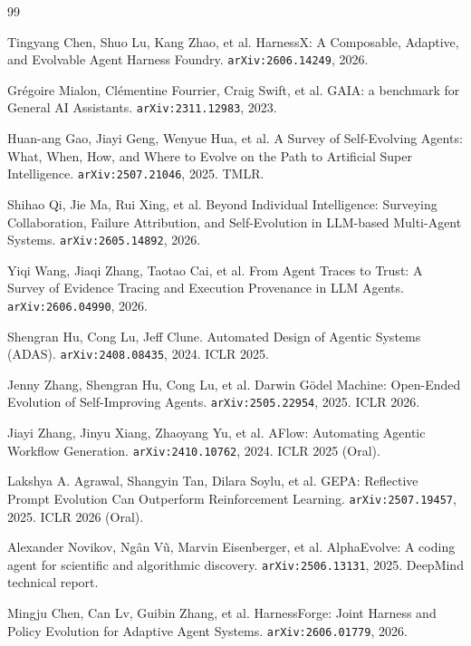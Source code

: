 \begin{thebibliography}{99}
\setlength{\itemsep}{3pt}\setlength{\parskip}{0pt}

 Tingyang Chen, Shuo Lu, Kang Zhao, et al. HarnessX: A
  Composable, Adaptive, and Evolvable Agent Harness Foundry.
  \texttt{arXiv:2606.14249}, 2026.

 Gr\'{e}goire Mialon, Cl\'{e}mentine Fourrier, Craig Swift,
  et al. GAIA: a benchmark for General AI Assistants.
  \texttt{arXiv:2311.12983}, 2023.

 Huan-ang Gao, Jiayi Geng, Wenyue Hua, et al.
  A Survey of Self-Evolving Agents: What, When, How, and Where to Evolve
  on the Path to Artificial Super Intelligence. \texttt{arXiv:2507.21046},
  2025. TMLR.

 Shihao Qi, Jie Ma, Rui Xing, et al. Beyond
  Individual Intelligence: Surveying Collaboration, Failure Attribution,
  and Self-Evolution in LLM-based Multi-Agent Systems.
  \texttt{arXiv:2605.14892}, 2026.

 Yiqi Wang, Jiaqi Zhang, Taotao Cai, et al.
  From Agent Traces to Trust: A Survey of Evidence Tracing and Execution
  Provenance in LLM Agents. \texttt{arXiv:2606.04990}, 2026.

 Shengran Hu, Cong Lu, Jeff Clune. Automated Design of
  Agentic Systems (ADAS). \texttt{arXiv:2408.08435}, 2024. ICLR 2025.

 Jenny Zhang, Shengran Hu, Cong Lu, et al. Darwin G\"odel
  Machine: Open-Ended Evolution of Self-Improving Agents.
  \texttt{arXiv:2505.22954}, 2025. ICLR 2026.

 Jiayi Zhang, Jinyu Xiang, Zhaoyang Yu, et al. AFlow:
  Automating Agentic Workflow Generation. \texttt{arXiv:2410.10762}, 2024.
  ICLR 2025 (Oral).

 Lakshya A. Agrawal, Shangyin Tan, Dilara Soylu, et al.
  GEPA: Reflective Prompt Evolution Can Outperform Reinforcement Learning.
  \texttt{arXiv:2507.19457}, 2025. ICLR 2026 (Oral).

 Alexander Novikov, Ng\^{a}n V\~{u}, Marvin
  Eisenberger, et al. AlphaEvolve: A coding agent for scientific and
  algorithmic discovery. \texttt{arXiv:2506.13131}, 2025. DeepMind
  technical report.

 Mingju Chen, Can Lv, Guibin Zhang, et al.
  HarnessForge: Joint Harness and Policy Evolution for Adaptive Agent
  Systems. \texttt{arXiv:2606.01779}, 2026.


\end{thebibliography}
